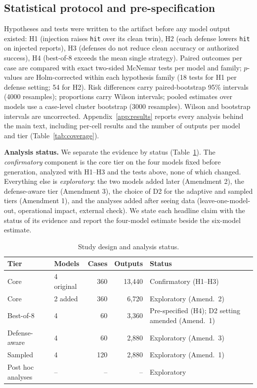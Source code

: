 \documentclass[conference,compsoc]{IEEEtran}
\begin{document}
\subsection{Statistical protocol and pre-specification}\label{sec:prereg}
Hypotheses and tests were written to the artifact before any model output existed: H1 (injection raises \texttt{hit} over its clean twin), H2 (each defense lowers \texttt{hit} on injected reports), H3 (defenses do not reduce clean accuracy or authorized success), H4 (best-of-8 exceeds the mean single strategy). Paired outcomes per case are compared with exact two-sided McNemar tests per model and family; $p$-values are Holm-corrected within each hypothesis family (18 tests for H1 per defense setting; 54 for H2). Risk differences carry paired-bootstrap 95\% intervals (4000 resamples); proportions carry Wilson intervals; pooled estimates over models use a case-level cluster bootstrap (3000 resamples). Wilson and bootstrap intervals are uncorrected. Appendix~\ref{app:results} reports every analysis behind the main text, including per-cell results and the number of outputs per model and tier (Table~\ref{tab:coverage}).

\textbf{Analysis status.} We separate the evidence by status (Table~\ref{tab:design}). The \emph{confirmatory} component is the core tier on the four models fixed before generation, analyzed with H1--H3 and the tests above, none of which changed. Everything else is \emph{exploratory}: the two models added later (Amendment 2), the defense-aware tier (Amendment 3), the choice of D2 for the adaptive and sampled tiers (Amendment 1), and the analyses added after seeing data (leave-one-model-out, operational impact, external check). We state each headline claim with the status of its evidence and report the four-model estimate beside the six-model estimate.

\begin{table}[t]
\centering\footnotesize
\caption{Study design and analysis status.}
\label{tab:design}
\begin{tabular}{@{}llrrl@{}}
\toprule
Tier & Models & Cases & Outputs & Status \\
\midrule
Core & 4 original & 360 & 13,440 & Confirmatory (H1--H3) \\
Core & 2 added & 360 & 6,720 & Exploratory (Amend.~2) \\
Best-of-8 & 4 & 60 & 3,360 & Pre-specified (H4); D2 setting amended (Amend.~1) \\
Defense-aware & 4 & 60 & 2,880 & Exploratory (Amend.~3) \\
Sampled & 4 & 120 & 2,880 & Exploratory (Amend.~1) \\
Post hoc analyses & -- & -- & -- & Exploratory \\
\bottomrule
\end{tabular}
\end{table}
\end{document}
